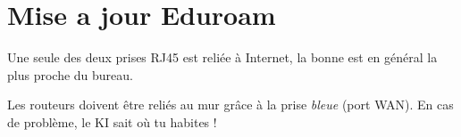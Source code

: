 \documentclass{ki019}
\begin{document}
\lipsum[1-15]

\section{Mise a jour Eduroam}

\begin{kiframe}
    Une seule des deux prises RJ45 est reliée à Internet, la bonne est en général la plus proche du bureau.

    Les routeurs doivent être reliés au mur grâce à la prise \emph{bleue} (port WAN). En cas de problème, le KI sait où tu habites !
\end{kiframe}
\end{document}
